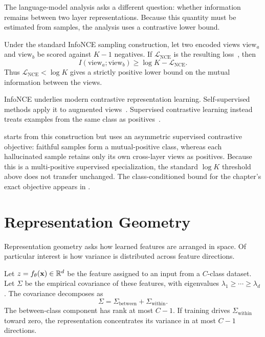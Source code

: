 The language-model analysis asks a different question: whether information remains
between two layer representations. Because this quantity must be estimated from
samples, the analysis uses a contrastive lower bound.

\begin{method}
Under the standard InfoNCE sampling construction, let two encoded views
$\mathrm{view}_a$ and $\mathrm{view}_b$ be scored against $K-1$ negatives. If
$\mathcal{L}_{\mathrm{NCE}}$ is the resulting loss~\citep{oord2018representation},
then
\[
  I(\mathrm{view}_a;\mathrm{view}_b)
  \ge \log K-\mathcal{L}_{\mathrm{NCE}}.
\]
Thus $\mathcal{L}_{\mathrm{NCE}}<\log K$ gives a strictly positive lower bound on
the mutual information between the views.
\label{method:bg:infonce}
\end{method}

InfoNCE underlies modern contrastive representation learning. Self-supervised
methods apply it to augmented views~\citep{chen2020simclr}. Supervised contrastive
learning instead treats examples from the same class as
positives~\citep{khosla2020supervised}.

 starts from this construction but uses an
asymmetric supervised contrastive objective: faithful samples form a
mutual-positive class, whereas each hallucinated sample retains only its own
cross-layer views as positives. Because this is a multi-positive supervised
specialization, the standard $\log K$ threshold above does not transfer unchanged.
The class-conditioned bound for the chapter's exact objective appears in
.

\section{Representation Geometry}
\label{sec:bg:geometry}

Representation geometry asks how learned features are arranged in space. Of
particular interest is how variance is distributed across feature directions.

Let $z=f_\theta({\mathbf{x}})\in\mathbb{R}^d$ be the feature assigned to an input from a
$C$-class dataset. Let $\Sigma$ be the empirical covariance of these features,
with eigenvalues $\lambda_1\ge\cdots\ge\lambda_d$. The covariance decomposes as
\[
  \Sigma=\Sigma_{\mathrm{between}}+\Sigma_{\mathrm{within}}.
\]
The between-class component has rank at most $C-1$. If training drives
$\Sigma_{\mathrm{within}}$ toward zero, the representation concentrates its
variance in at most $C-1$ directions.

